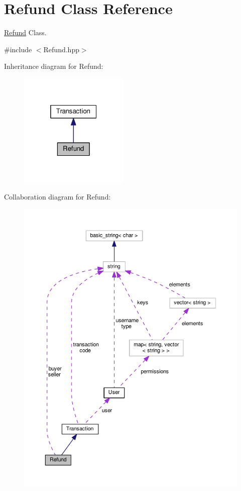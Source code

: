 \hypertarget{class_refund}{\section{Refund Class Reference}
\label{class_refund}
}


\hyperlink{class_refund}{Refund} Class.  




{\ttfamily \#include $<$Refund.\-hpp$>$}



Inheritance diagram for Refund\-:
\nopagebreak
\begin{figure}[H]
\begin{center}
\leavevmode
\includegraphics[width=148pt]{class_refund__inherit__graph}
\end{center}
\end{figure}


Collaboration diagram for Refund\-:
\nopagebreak
\begin{figure}[H]
\begin{center}
\leavevmode
\includegraphics[width=350pt]{class_refund__coll__graph}
\end{center}
\end{figure}
